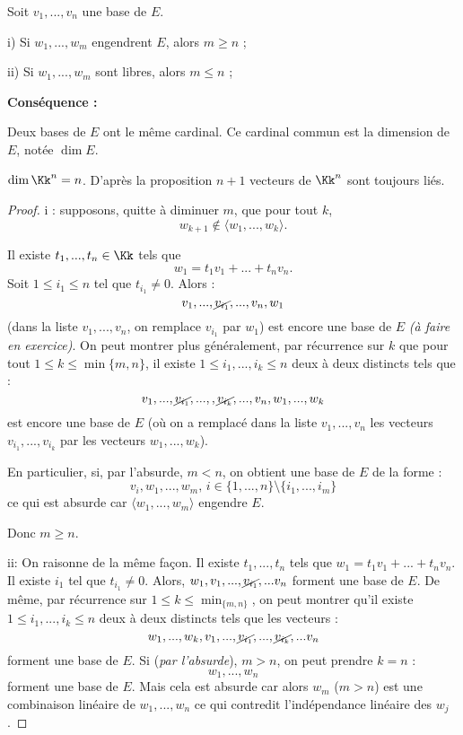 \documentclass[class=report,crop=false]{standalone}
\newcommand{\exoo}{\emph{(à faire en exercice)}}
\begin{document}
\begin{proposition}
Soit $v_1,...,v_n$ une base de $E$. 

i) Si $w_1,...,w_m$ engendrent $E$, alors $m \ge n$ ;

ii) Si $w_1,...,w_m$ sont libres, alors $m \le n$ ;


\end{proposition}


{\bf Conséquence : }

\begin{definition}
Deux bases de $E$ ont le même cardinal. Ce cardinal commun est la dimension de $E$, notée $\dim E$.
\end{definition}


\begin{remarque*}
$\dim \Kk^n = n$. D'après la proposition $n+1$ vecteurs de $\Kk^n$ sont toujours liés.
\end{remarque*}

\begin{proof}
i : supposons, quitte à diminuer $m$, que pour tout $k$, \[w_{k+1} \not\in \langle w_1,...,w_k \rangle .\]

Il existe $t_1,...,t_n \in \Kk$ tels que \[w_1 = t_1 v_1 + ... + t_n v_n .\]
Soit $1 \le i_1 \le n$ tel que $t_{i_1} \neq 0$. Alors :
\[v_1, ..., \cancel{v_{i_1} },...,v_n,w_1\]
(\og dans la liste $v_1,...,v_n$, on remplace $v_{i_1}$ par $w_1$\fg) est encore une base de $E$ \exoo. On peut montrer plus généralement, par récurrence sur $k$ que pour tout $1 \le k \le \min\{m,n\}$, il existe $1 \le i_1,...,i_k\le n$ deux à deux distincts tels que :
\[v_1,...,\cancel{v_{i_1}}, ..., ,\cancel{v_{i_k}},...,v_n,w_1,...,w_k\]
est encore une base de $E$ (où on a remplacé dans la liste $v_1,...,v_n$ les vecteurs $v_{i_1},...,v_{i_k}$ par les vecteurs $w_1,...,w_k$).

En particulier, si, par l'absurde, $m <n$, on obtient une base de $E$ de la forme :
\[v_i,w_1,...,w_m, \, i \in \{1,...,n\}\setminus \{i_1,...,i_m\}\]
ce qui est absurde car $\langle w_1,...,w_m \rangle$ engendre $E$.

Donc $m \ge n$.

ii:  On raisonne de la même fa\c{c}on. Il existe $t_1,...,t_n$ tels que $w_1 = t_1 v_1 +...+ t_n v_n$. Il existe $i_1$ tel que $t_{i_{1}} \neq 0$. Alors, $w_1, v_1,...,\cancel{v_{i_1}},...v_n$ forment une base de $E$. De même, par récurrence sur $ 1\le k \le \min_{\{m,n\}}$, on peut montrer qu'il existe $1 \le i_1,...,i_k \le n$ deux à deux distincts tels que les vecteurs :
\[w_1,...,w_k, v_1,...,\cancel{v_{i_1}},...,\cancel{v_{i_k}},...v_n\]
forment une base de $E$. Si ({\it par l'absurde}), $m >n$, on peut prendre $k = n$ :
\[w_1,...,w_n\]
forment une base de $E$. Mais cela est absurde car alors $w_m$ ($m>n$) est une combinaison linéaire de $w_1,...,w_n$ ce qui contredit l'indépendance linéaire des $w_j$.
\end{proof}
\end{document}
